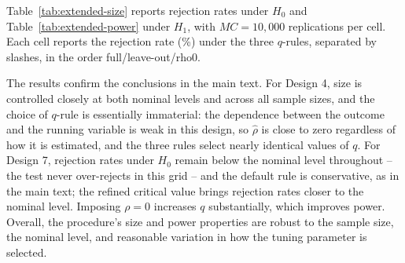 \documentclass[11pt]{article}
\numberwithin{equation}{section}
\begin{document}
Table~\ref{tab:extended-size} reports rejection rates under $H_0$ and Table~\ref{tab:extended-power} under $H_1$, with $MC=10{,}000$ replications per cell. Each cell reports the rejection rate (\%) under the three $q$-rules, separated by slashes, in the order full/leave-out/rho0.

The results confirm the conclusions in the main text. For Design 4, size is controlled closely at both nominal levels and across all sample sizes, and the choice of $q$-rule is essentially immaterial: the dependence between the outcome and the running variable is weak in this design, so $\hat\rho$ is close to zero regardless of how it is estimated, and the three rules select nearly identical values of $q$. For Design 7, rejection rates under $H_0$ remain below the nominal level throughout -- the test never over-rejects in this grid -- and the default rule is conservative, as in the main text; the refined critical value brings rejection rates closer to the nominal level. Imposing $\rho=0$ increases $q$ substantially, which improves power. 
Overall, the procedure's size and power properties are robust to the sample size, the nominal level, and reasonable variation in how the tuning parameter is selected.
\end{document}
